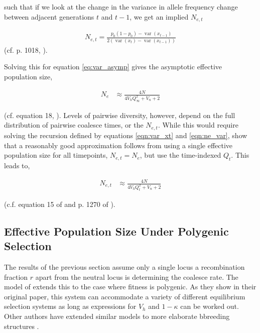 \documentclass[11pt]{article}
\DeclareMathOperator{\var}{var}
\begin{document}
such that if we look at the change in the variance in allele frequency change
between adjacent generations $t$ and $t-1$, we get an implied $N_{e,t}$

\begin{align}
  \label{eqn:ne_var}
  N_{e,t} = \frac{p_0(1-p_0) - \var(x_{t-1})}{2(\var(x_t) - \var(x_{t-1}))}
\end{align}
%
(cf. p. 1018, \cite{Santiago1995-hx}). 

Solving this for equation \eqref{eq:var_asymp} gives the asymptotic effective
population size,

\begin{align}
  N_e &\approx \frac{4N}{4 V_h Q_\infty^2 +V_n+2}
\end{align}

(cf. equation 18, \cite{Santiago1995-hx}). Levels of pairwise diversity,
however, depend on the full distribution of pairwise coalesce times, or the
$N_{e,t}$. While this would require solving the recursion defined by equations
\eqref{eqn:var_xt} and \eqref{eqn:ne_var}, \textcite{Santiago1998-bs} show that
a reasonably good approximation follows from using a single effective
population size for all timepoints, $N_{e,t} = N_e$, but use the time-indexed
$Q_t$. This leads to,

\begin{align}
  \label{eq:ne_t}
  N_{e,t} &\approx \frac{4N}{4 V_h Q_t^2 +V_n+2}
\end{align}

(c.f. equation 15 of \cite{Santiago1995-hx} and p. 1270 of \cite{Santiago2016-mu}).


\subsection{Effective Population Size Under Polygenic Selection}

The results of the previous section assume only a single locus a recombination
fraction $r$ apart from the neutral locus is determining the coalesce rate. The
model of \textcite{Santiago1998-bs} extends this to the case where fitness is
polygenic. As they show in their original paper, this system can accommodate a
variety of different equilibrium selection systems as long as expressions for
$V_h$ and $1-\kappa$ can be worked out. Other authors have extended similar models to
more elaborate bbreeding structures \parencite{Wray1990-zf,Woolliams1993-qo}.
\end{document}

